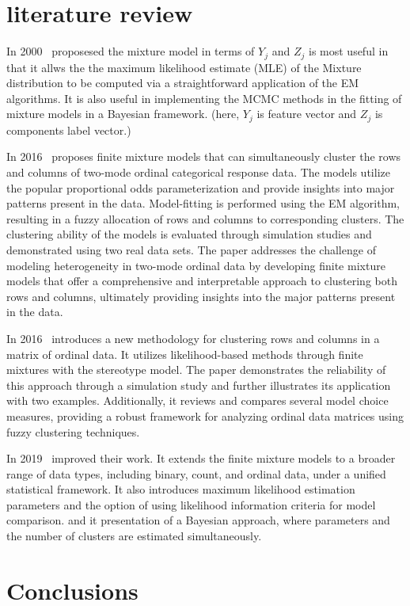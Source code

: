 \documentclass{article}
\begin{document}
\section{literature review}

In 2000~\cite{mclachlan2000finite} proposesed the mixture model in terms of $Y_j$ and $Z_j$ is most useful 
in that it allws the the maximum likelihood estimate (MLE) of the Mixture distribution to be computed via 
a straightforward application of the EM algorithms.
It is also useful in implementing the MCMC methods in the fitting of mixture models in a Bayesian framework.
(here, $Y_j$ is feature vector and $Z_j$ is components label vector.)

In 2016~\cite{matechou2016biclustering} proposes finite mixture models that can simultaneously cluster the rows and columns of two-mode ordinal categorical response data. The models utilize the popular proportional odds parameterization and provide insights into major patterns present in the data. Model-fitting is performed using the EM algorithm, resulting in a fuzzy allocation of rows and columns to corresponding clusters. The clustering ability of the models is evaluated through simulation studies and demonstrated using two real data sets. The paper addresses the challenge of modeling heterogeneity in two-mode ordinal data by developing finite mixture models that offer a comprehensive and interpretable approach to clustering both rows and columns, ultimately providing insights into the major patterns present in the data.

In 2016~\cite{fernandez2016mixture} introduces a new methodology for clustering rows and columns in a matrix of ordinal data. It utilizes likelihood-based methods through finite mixtures with the stereotype model. The paper demonstrates the reliability of this approach through a simulation study and further illustrates its application with two examples. Additionally, it reviews and compares several model choice measures, providing a robust framework for analyzing ordinal data matrices using fuzzy clustering techniques.

In 2019~\cite{fernandez2019finite} improved their work. It extends the finite mixture models to a broader range of data types, including binary, count, and ordinal data, under a unified statistical framework. It also introduces maximum likelihood estimation parameters and the option of using likelihood information criteria for model comparison. and it presentation of a Bayesian approach, where parameters and the number of clusters are estimated simultaneously. 

\section{Conclusions}


\end{document}
